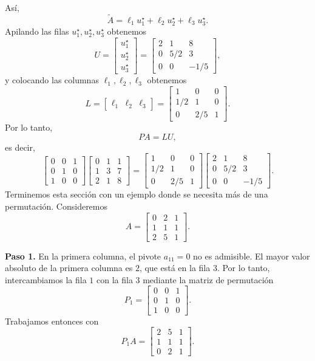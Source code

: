 Así,
\[
\widetilde{A} = \ell_1 u_1^\star + \ell_2 u_2^\star + \ell_3 u_3^\star.
\]
Apilando las filas $u_1^\star, u_2^\star, u_3^\star$ obtenemos
\[
U =
\begin{bmatrix} u_1^\star \\ u_2^\star \\ u_3^\star \end{bmatrix}
=
\begin{bmatrix}
2 & 1 & 8 \\
0 & 5/2 & 3 \\
0 & 0 & -1/5
\end{bmatrix},
\]
y colocando las columnas $\ell_1, \ell_2, \ell_3$ obtenemos
\[
L =
\begin{bmatrix}
\ell_1 & \ell_2 & \ell_3
\end{bmatrix}
=
\begin{bmatrix}
1 & 0 & 0 \\
1/2 & 1 & 0 \\
0 & 2/5 & 1
\end{bmatrix}.
\]
Por lo tanto,
\[
PA = LU,
\]
es decir,
\[
\begin{bmatrix}
0 & 0 & 1 \\
0 & 1 & 0 \\
1 & 0 & 0
\end{bmatrix}
\begin{bmatrix}
0 & 1 & 1 \\
1 & 3 & 7 \\
2 & 1 & 8
\end{bmatrix}
=
\begin{bmatrix}
1 & 0 & 0 \\
1/2 & 1 & 0 \\
0 & 2/5 & 1
\end{bmatrix}
\begin{bmatrix}
2 & 1 & 8 \\
0 & 5/2 & 3 \\
0 & 0 & -1/5
\end{bmatrix}.
\]
Terminemos esta sección con un ejemplo donde se necesita más de una permutación. Consideremos
\[
A = \begin{bmatrix}
0 & 2 & 1 \\
1 & 1 & 1 \\
2 & 5 & 1
\end{bmatrix}.
\]

\textbf{Paso 1.} En la primera columna, el pivote $a_{11}=0$ no es admisible. El mayor valor absoluto de la primera columna es $2$, que está en la fila $3$. Por lo tanto, intercambiamos la fila $1$ con la fila $3$ mediante la matriz de permutación
\[
P_1 = \begin{bmatrix}
0 & 0 & 1 \\
0 & 1 & 0 \\
1 & 0 & 0
\end{bmatrix}.
\]
Trabajamos entonces con
\[
P_1 A =
\begin{bmatrix}
2 & 5 & 1 \\
1 & 1 & 1 \\
0 & 2 & 1
\end{bmatrix}.
\]

